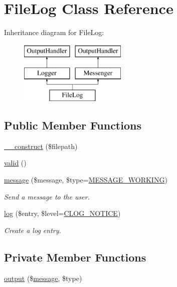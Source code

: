 \hypertarget{classFileLog}{\section{File\-Log Class Reference}
\label{classFileLog}
}
Inheritance diagram for File\-Log\-:\begin{figure}[H]
\begin{center}
\leavevmode
\includegraphics[height=3.000000cm]{classFileLog}
\end{center}
\end{figure}
\subsection*{Public Member Functions}
\begin{DoxyCompactItemize}
\item 
\hyperlink{classFileLog_af5db36841991cd1c97bf52518cdd4d69}{\-\_\-\-\_\-construct} (\$filepath)
\item 
\hyperlink{classFileLog_aad2c8a446e482b02e75bd220941b376d}{valid} ()
\item 
\hyperlink{classFileLog_a4032cc03bff070c5b4db901b94882bca}{message} (\$message, \$type=\hyperlink{Messenger_8iface_a42a959808a10ab30584347844a7d1657}{M\-E\-S\-S\-A\-G\-E\-\_\-\-W\-O\-R\-K\-I\-N\-G})
\begin{DoxyCompactList}\small\item\em Send a message to the user. \end{DoxyCompactList}\item 
\hyperlink{classFileLog_ac117b17bb28c6e1cec5f175a9d2b5e1c}{log} (\$entry, \$level=\hyperlink{group__log__levels_ga8fe5fb4d67cefbcc5556321a2a1ffaec}{C\-L\-O\-G\-\_\-\-N\-O\-T\-I\-C\-E})
\begin{DoxyCompactList}\small\item\em Create a log entry. \end{DoxyCompactList}\end{DoxyCompactItemize}
\subsection*{Private Member Functions}
\begin{DoxyCompactItemize}
\item 
\hyperlink{classFileLog_a4fdea8b9e461189e3af353fc891590f0}{output} (\$\hyperlink{classFileLog_a4032cc03bff070c5b4db901b94882bca}{message}, \$type)
\end{DoxyCompactItemize}
